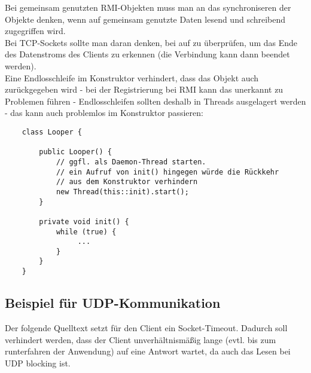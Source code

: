 \noindent
Bei gemeinsam genutzten RMI-Objekten muss man an das synchroniseren der Objekte denken, wenn auf gemeinsam genutzte
Daten lesend und schreibend zugegriffen wird.\\

\noindent
Bei TCP-Sockets sollte man daran denken, bei  auf  zu überprüfen, um das Ende des Datenstroms des Clients zu erkennen (die Verbindung kann dann beendet werden).\\

\noindent
Eine Endlosschleife im Konstruktor verhindert, dass das Objekt auch zurückgegeben wird - bei der Registrierung bei RMI kann das unerkannt zu Problemen führen - Endlosschleifen sollten deshalb in Threads ausgelagert werden - das kann auch problemlos im Konstruktor passieren:

\begin{verbatim}
    class Looper {

        public Looper() {
            // ggfl. als Daemon-Thread starten.
            // ein Aufruf von init() hingegen würde die Rückkehr
            // aus dem Konstruktor verhindern
            new Thread(this::init).start();
        }

        private void init() {
            while (true) {
                 ...
            }
        }
    }
\end{verbatim}


\subsection*{Beispiel für UDP-Kommunikation}
Der folgende Quelltext setzt für den Client ein Socket-Timeout. Dadurch soll verhindert werden, dass der Client unverhältnismäßig lange (evtl. bis zum runterfahren der Anwendung) auf eine Antwort wartet, da auch das Lesen bei UDP blocking ist.

